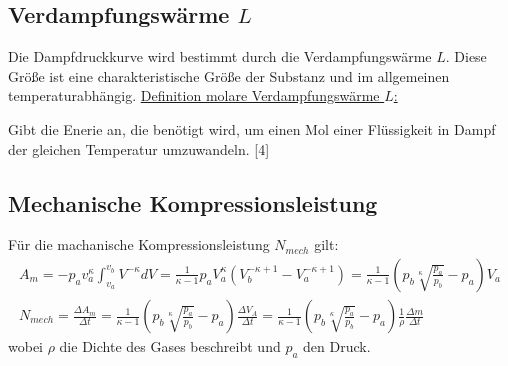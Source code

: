 \subsection*{Verdampfungswärme $L$}
Die Dampfdruckkurve wird bestimmt durch die Verdampfungswärme $L$.
Diese Größe ist eine charakteristische Größe der Substanz und im allgemeinen temperaturabhängig.
\uline{Definition molare Verdampfungswärme $L$:}
\begin{flushleft}
Gibt die Enerie an, die benötigt wird, um einen Mol einer Flüssigkeit in Dampf
der gleichen Temperatur umzuwandeln. 
\cite{Verdampfungswärme}[4]
\end{flushleft}
\subsection*{Mechanische Kompressionsleistung}
Für die machanische Kompressionsleistung $N_{mech}$ gilt:
\begin{gather}
    A_m=-p_av_a^{\kappa}\int_{v_a}^{v_b} V^{-\kappa}dV=\frac{1}{\kappa -1}p_aV_a^{\kappa}(V_b^{-\kappa +1}-V_a^{-\kappa+1})=\frac{1}{\kappa-1}(p_b\sqrt[\kappa]{\frac{p_a}{p_b}}-p_a) V_a \\
    N_{mech}=\frac{\Delta A_m}{\Delta t}=\frac{1}{\kappa -1}(p_b\sqrt[\kappa]{\frac{p_a}{p_b}}-p_a)\frac{\Delta V_A}{\Delta t}=\frac{1}{\kappa -1}(p_b\sqrt[\kappa]{\frac{p_a}{p_b}}-p_a)\frac{1}{\rho}\frac{\Delta m}{\Delta t}
\end{gather}
wobei $\rho$ die Dichte des Gases beschreibt und $p_a$ den Druck.
